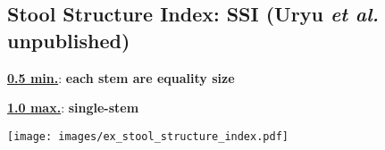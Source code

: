 \documentclass[a0, 25, plainboxedsections]{sciposter} %
\begin{document}
\begin{multicols}{2}
\vspace{-1.8em}\begin{figure}
 \begin{minipage}{0.6\hsize}
 \subsection*{Stool Structure Index: SSI \tiny(Uryu \textit{et al.} unpublished)}

\textbf{\underline{0.5 min.}}: \textbf{each stem are equality size}

\textbf{\underline{1.0 max.}}: \textbf{single-stem}
 \end{minipage}
 \begin{minipage}{0.4\hsize}
  \centering
   \texttt{[image: images/ex\_stool\_structure\_index.pdf]}  
 \end{minipage}
\end{figure}

\end{multicols}
\begin{mdframed}[style=section.frame]
  \centering\LARGE\textbf{\color{white}{RESULTS}}
\end{mdframed}\vspace{-1.2em}
\end{document}
